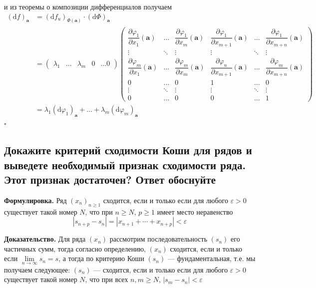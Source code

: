 \documentclass[a4paper]{article}
\newcommand{\qed}{\hfill$\square$}
\newcommand{\m}[1]{\mathbf{#1}}
\begin{document}
и из теоремы о композиции дифференциалов получаем
$$\begin{aligned}
(\mathrm{d}f)_\m{a} &= (\mathrm{d}f_u)_{\Phi(\m{a})} \cdot (\mathrm{d}\Phi)_{\m{a}} \\
&= \begin{pmatrix}
\lambda_1 & \ldots & \lambda_m & 0 & \ldots 0
\end{pmatrix} \begin{pmatrix}
\dfrac{\partial \varphi_1}{\partial x_1}(\m{a}) & \ldots & \dfrac{\partial \varphi_1}{\partial x_m}(\m{a}) & \dfrac{\partial \varphi_1}{\partial x_{m+1}}(\m{a}) & \ldots & \dfrac{\partial \varphi_1}{\partial x_{m+n}}(\m{a}) \\
\vdots & \ddots & \vdots & \vdots & \ddots & \vdots\\
\dfrac{\partial \varphi_m}{\partial x_1}(\m{a}) & \ldots & \dfrac{\partial \varphi_m}{\partial x_m}(\m{a}) & \dfrac{\partial \varphi_n}{\partial x_{m+1}}(\m{a}) & \ldots & \dfrac{\partial \varphi_m}{\partial x_{m+n}}(\m{a}) \\
0 & \ldots & 0 & 1 & \ldots &0 \\
\vdots & \ddots & \vdots & \vdots & \ddots & \vdots\\
0 & \ldots & 0 & 0 & \ldots & 1
\end{pmatrix} \\
&= \lambda_1 (\mathrm{d}\varphi_1)_{\m{a}} + \ldots + \lambda_m (\mathrm{d}\varphi_m)_{\m{a}}
\end{aligned}$$\qed

\subsection{Докажите критерий сходимости Коши для рядов и выведете необходимый признак сходимости ряда. Этот признак достаточен? Ответ обоснуйте}
\textbf{Формулировка.} Ряд $(x_n)_{n\ge 1}$ сходится, если и только если для любого $\varepsilon >0$ существует такой номер $N$, что при $n \ge N$, $p\ge 1$ имеет место неравенство
$$
|s_{n+p} -s_n| = |x_{n+1}+ \cdots + x_{n+p}| < \varepsilon
$$

\textbf{Доказательство.} Для ряда $(x_n)$ рассмотрим последовательность $(s_n)$ его частичных сумм, тогда согласно определению, $(x_n)$ сходится, если и только если $\lim\limits_{n \to \infty} s_n = s$, а тогда по критерию Коши $(s_n)$ — фундаментальная, т.е. мы получаем следующее: $(s_n)$ — сходится, если и только если для любого $\varepsilon >0$ существует такой номер $N$, что при всех $n,m \ge N$, $|s_m- s_n| < \varepsilon$
\end{document}
